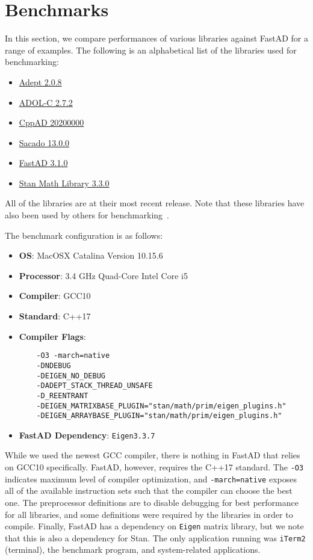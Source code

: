 \section{Benchmarks}

In this section, we compare performances of various libraries against FastAD for a range of examples.
The following is an alphabetical list of the libraries used for benchmarking:\@
\begin{itemize}
    \item \href{http://www.met.reading.ac.uk/clouds/adept/}{Adept 2.0.8}
    \item \href{https://github.com/coin-or/ADOL-C}{ADOL-C 2.7.2}
    \item \href{https://coin-or.github.io/CppAD/doc/cppad.htm}{CppAD 20200000}
    \item \href{https://github.com/trilinos/Trilinos/tree/master/packages/sacado}{Sacado 13.0.0}
    \item \href{https://github.com/JamesYang007/FastAD}{FastAD 3.1.0}
    \item \href{https://github.com/stan-dev/math}{Stan Math Library 3.3.0}
\end{itemize}
All of the libraries are at their most recent release.
Note that these libraries have also been used by others for 
benchmarking~\cite{carpenter:2015}\cite{margossian:2018}\cite{hogan:2014}.

The benchmark configuration is as follows:
\begin{itemize}
    \item \textbf{OS}: MacOSX Catalina Version 10.15.6 
    \item \textbf{Processor}: 3.4 GHz Quad-Core Intel Core i5
    \item \textbf{Compiler}: GCC10
    \item \textbf{Standard}: C++17
    \item \textbf{Compiler Flags}: 
\begin{verbatim}
    -O3 -march=native 
    -DNDEBUG 
    -DEIGEN_NO_DEBUG 
    -DADEPT_STACK_THREAD_UNSAFE 
    -D_REENTRANT 
    -DEIGEN_MATRIXBASE_PLUGIN="stan/math/prim/eigen_plugins.h" 
    -DEIGEN_ARRAYBASE_PLUGIN="stan/math/prim/eigen_plugins.h"
\end{verbatim}
    \item \textbf{FastAD Dependency}: \verb|Eigen3.3.7|
\end{itemize}
While we used the newest GCC compiler, there is nothing in FastAD that relies on GCC10 specifically.
FastAD, however, requires the C++17 standard.
The \verb|-O3| indicates maximum level of compiler optimization,
and \verb|-march=native| exposes all of the available instruction sets 
such that the compiler can choose the best one.
The preprocessor definitions are to disable debugging
for best performance for all libraries, and some definitions were required by the libraries in order to compile.
Finally, FastAD has a dependency on \verb|Eigen| matrix library,
but we note that this is also a dependency for Stan.
The only application running was \verb|iTerm2| (terminal),
the benchmark program, and system-related applications.

